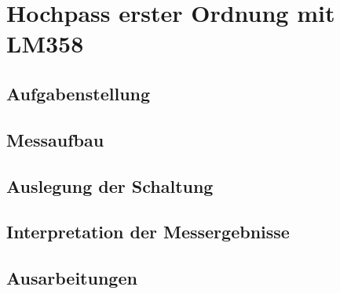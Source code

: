 \section{Hochpass erster Ordnung mit LM358}
\subsection{Aufgabenstellung}

\subsection{Messaufbau}

\subsection{Auslegung der Schaltung}

\subsection{Interpretation der Messergebnisse}

\subsection{Ausarbeitungen}
